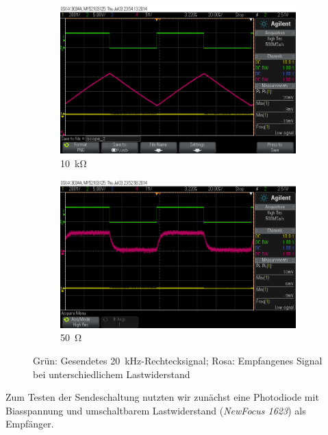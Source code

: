 \documentclass[12pt,a4paper]{article}
\begin{document}
\begin{figure}[H]
  \centering
  \begin{subfigure}[b]{0.6\textwidth}
    \includegraphics[width=\textwidth]{../measurements/20140703/20kHz_10kOhm/scope_2.png}
    \caption{\SI{10}{\kilo\ohm}}
    \label{fig:direct_rx_10k_R}
  \end{subfigure}  
  \begin{subfigure}[b]{0.6\textwidth}
    \includegraphics[width=\textwidth]{../measurements/20140703/20kHz_50_Ohm/scope_0.png}
    \caption{\SI{50}{\ohm}}
    \label{fig:direct_rx_50_R}
  \end{subfigure}  
  \caption{Grün: Gesendetes \SI{20}{\kilo\hertz}-Rechtecksignal; Rosa: Empfangenes Signal bei unterschiedlichem Lastwiderstand}
  \label{fig:direct_rx}
\end{figure}

Zum Testen der Sendeschaltung nutzten wir zunächst eine Photodiode mit Biasspannung und umschaltbarem Lastwiderstand (\textit{NewFocus 1623}) als Empfänger.
\end{document}
